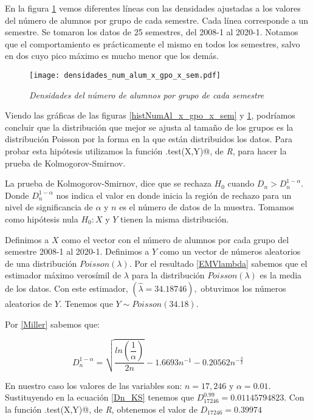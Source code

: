 En la figura \ref{densidadesNumAl_x_gpo_x_sem} vemos diferentes líneas con las densidades ajustadas a los valores del número de alumnos por grupo de cada semestre. Cada línea corresponde a un semestre. Se tomaron los datos de 25 semestres, del 2008-1 al 2020-1. Notamos que el comportamiento es prácticamente el mismo en todos los semestres, salvo en dos cuyo pico máximo es mucho menor que los demás. 

\begin{figure}[H]
\centering
\texttt{[image: densidades\_num\_alum\_x\_gpo\_x\_sem.pdf]} %
\caption{\textit{Densidades del número de alumnos por grupo de cada semestre}}\label{densidadesNumAl_x_gpo_x_sem}
\end{figure}

Viendo las gráficas de las figuras \ref{histNumAl_x_gpo_x_sem} y \ref{densidadesNumAl_x_gpo_x_sem}, podríamos concluir que la distribución que mejor se ajusta al tamaño de los grupos es la distribución Poisson por la forma en la que están distribuidos los datos. Para probar esta hipótesis utilizamos la función \verb@ks.test(X,Y)@, de \textit{R}, para hacer la prueba de Kolmogorov-Smirnov.

La prueba de Kolmogorov-Smirnov, dice que se rechaza $H_{0}$ cuando $D_{n} > D_{n}^{1-\alpha}$. Donde $D_{n}^{1-\alpha}$ nos indica el valor en donde inicia la región de rechazo para un nivel de significancia de $\alpha$ y $n$ es el número de datos de la muestra. Tomamos como hipótesis nula $H_{0}: X$ y $Y$ tienen la misma distribución.

Definimos a $X$ como el vector con el número de alumnos por cada grupo del semestre 2008-1 al 2020-1. Definimos a $Y$ como un vector de números aleatorios de una distribución $Poisson(\lambda)$. Por el resultado \ref{EMVlambda} sabemos que el estimador máximo verosímil de $\lambda$ para la distribución $Poisson(\lambda)$ es la media de los datos. Con este estimador, $(\hat{\lambda} = 34.18746),$ obtuvimos los números aleatorios de $Y$. Tenemos que $Y \sim Poisson(34.18)$.

Por \ref{Miller} sabemos que:

\begin{equation}\label{Dn_KS}
D_{n}^{1-\alpha} = \sqrt{\dfrac{ln \left(\dfrac{1}{\alpha}\right)}{2n}} - 1.6693 n^{-1} - 0.20562 n^{-\frac{3}{2}}
\end{equation}

En nuestro caso los valores de las variables son: $n = 17,246$ y $\alpha = 0.01$. Sustituyendo en la ecuación \ref{Dn_KS} tenemos que $D_{17246}^{0.99} = 0.01145794823$. Con la función \verb@ks.test(X,Y)@, de \textit{R}, obtenemos el valor de $D_{17246} = 0.39974$

